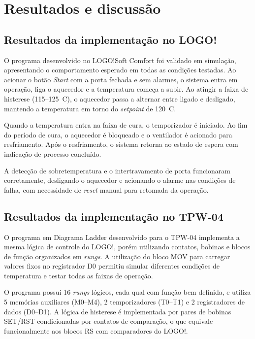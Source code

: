 \documentclass[
  12pt,
  openright,
  oneside,
  a4paper,
  chapter=TITLE,
  section=TITLE,
  brazilian
]{abntex2}
\begin{document}
\chapter{Resultados e discuss\~{a}o}

\section{Resultados da implementa\c{c}\~{a}o no LOGO!}

O programa desenvolvido no LOGO!Soft Comfort foi validado em simula\c{c}\~{a}o, apresentando o comportamento esperado em todas as condi\c{c}\~{o}es testadas. Ao acionar o bot\~{a}o \textit{Start} com a porta fechada e sem alarmes, o sistema entra em opera\c{c}\~{a}o, liga o aquecedor e a temperatura come\c{c}a a subir. Ao atingir a faixa de histerese (115--125~\textdegree{}C), o aquecedor passa a alternar entre ligado e desligado, mantendo a temperatura em torno do \textit{setpoint} de 120~\textdegree{}C.

Quando a temperatura entra na faixa de cura, o temporizador \'{e} iniciado. Ao fim do per\'{i}odo de cura, o aquecedor \'{e} bloqueado e o ventilador \'{e} acionado para resfriamento. Ap\'{o}s o resfriamento, o sistema retorna ao estado de espera com indica\c{c}\~{a}o de processo conclu\'{i}do.

A detec\c{c}\~{a}o de sobretemperatura e o intertravamento de porta funcionaram corretamente, desligando o aquecedor e acionando o alarme nas condi\c{c}\~{o}es de falha, com necessidade de \textit{reset} manual para retomada da opera\c{c}\~{a}o.

\section{Resultados da implementa\c{c}\~{a}o no TPW-04}

O programa em Diagrama Ladder desenvolvido para o TPW-04 implementa a mesma l\'{o}gica de controle do LOGO!, por\'{e}m utilizando contatos, bobinas e blocos de fun\c{c}\~{a}o organizados em \textit{rungs}. A utiliza\c{c}\~{a}o do bloco MOV para carregar valores fixos no registrador D0 permitiu simular diferentes condi\c{c}\~{o}es de temperatura e testar todas as faixas de opera\c{c}\~{a}o.

O programa possui 16 \textit{rungs} l\'{o}gicos, cada qual com fun\c{c}\~{a}o bem definida, e utiliza 5 mem\'{o}rias auxiliares (M0--M4), 2 temporizadores (T0--T1) e 2 registradores de dados (D0--D1). A l\'{o}gica de histerese \'{e} implementada por pares de bobinas SET/RST condicionadas por contatos de compara\c{c}\~{a}o, o que equivale funcionalmente aos blocos RS com comparadores do LOGO!.
\end{document}
